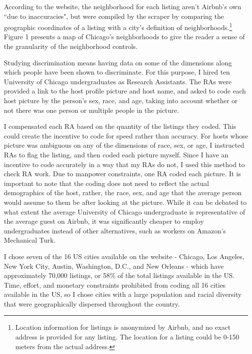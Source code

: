 \documentclass[11pt, oneside]{article}
\begin{document}
According to the website, the neighborhood for each listing aren't Airbnb's own ``due to inaccuracies", but were compiled by the scraper by comparing the geographic coordinates of a listing with a city's definition of neighborhoods.\footnote{Location information for listings is anonymized by Airbnb, and no exact address is provided for any listing. The location for a listing could be 0-150 meters from the actual address.} Figure 1 presents a map of Chicago's neighborhoods to give the reader a sense of the granularity of the neighborhood controls. 

Studying discrimination means having data on some of the dimensions along which people have been shown to discriminate. For this purpose, I hired ten University of Chicago undergraduates as Research Assistants. The RAs were provided a link to the host profile picture and host name, and asked to code each host picture by the person's sex, race, and age, taking into account whether or not there was one person or multiple people in the picture.  

I compensated each RA based on the quantity of the listings they coded. This could create the incentive to code for speed rather than accuracy. For hosts whose picture was ambiguous on any of the dimensions of race, sex, or age, I instructed RAs to flag the listing, and then coded each picture myself. Since I have an incentive to code accurately in a way that my RAs do not, I used this method to check RA work. Due to manpower constraints, one RA coded each picture. It is important to note that the coding does not need to reflect the actual demographics of the host, rather, the race, sex, and age that the average person would assume to them be after looking at the picture. While it can be debated to what extent the average University of Chicago undergraduate is representative of the average guest on Airbnb, it was significantly cheaper to employ undergraduates instead of other alternatives, such as workers on Amazon's Mechanical Turk. 

I chose seven of the 16 US cities available on the website - Chicago, Los Angeles, New York City, Austin, Washington, D.C., and New Orleans - which have approximately 70,000 listings, or 58\% of the total listings available in the US. Time, effort, and monetary constraints prohibited from coding all 16 cities available in the US, so I chose cities with a large population and racial diversity that were geographically dispersed throughout the country. 
\end{document}

